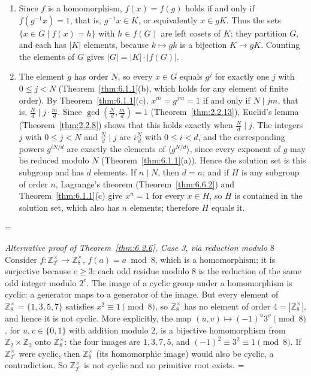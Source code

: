 \documentclass[11pt]{article}
\makeatletter
\theoremstyle{ntstyle}
\let\nt@closedisplay\]
\def\nt@guardedclose{\@ifnextchar\par{\nt@closeafterpar}{\@ifnextchar\end{\postdisplaypenalty\@M\nt@closedisplay}{\nt@closedisplay}}}
\def\nt@closeafterpar\par{\@ifnextchar\par{\nt@closeafterpar}{\@ifnextchar\end{\postdisplaypenalty\@M\nt@closedisplay\par}{\nt@closedisplay\par}}}
\renewenvironment{proof}[1][\proofname]{\par
  \pushQED{\qed}\normalfont\topsep\medskipamount\edef\nt@afterproof{\@endparpenalty=\the\@endparpenalty\relax}\@beginparpenalty\@M\@endparpenalty\@M\let\]\nt@guardedclose\trivlist\item[]\textit{#1\@addpunct{.}} \ignorespaces}{\ifvmode\addpenalty\@M\fi\popQED\nt@afterproof\endtrivlist\@endpefalse}
\newenvironment{altproof}[1][\proofname]{\begin{proof}[#1]}{\end{proof}}
\newcommand{\ZmodUnits}[1]{\mathbb{Z}_{#1}^{\times}}
\makeatother
\begin{document}
\begin{proof}

	\begin{enumerate}[label={\alph*)}]
		\item Since $f$ is a homomorphism, $f(x)=f(g)$ holds if and only if
					$f(g^{-1}x)=1$, that is, $g^{-1}x\in K$, or equivalently $x\in gK$.
					Thus the sets $\{x\in G\mid f(x)=h\}$ with $h\in f(G)$ are left
					cosets of $K$; they partition $G$, and each has $|K|$ elements,
					because $k\mapsto gk$ is a bijection $K\to gK$. Counting the elements
					of $G$ gives $|G|=|K|\cdot|f(G)|$.
		\item The element $g$ has order $N$, so every $x\in G$ equals $g^j$ for
					exactly one $j$ with $0\le j<N$ (Theorem~\ref{thm:6.1.1}(b), which holds
					for any element of finite order). By Theorem~\ref{thm:6.1.1}(c),
					$x^m=g^{jm}=1$ if and only if $N\mid jm$, that is,
					$\frac{N}{d}\mid j\cdot\frac{m}{d}$. Since $\gcd(\frac{N}{d},\frac{m}{d})=1$
					(Theorem~\ref{thm:2.2.13}), Euclid's lemma (Theorem~\ref{thm:2.2.8})
					shows that this holds exactly when $\frac{N}{d}\mid j$. The integers $j$
					with $0\le j<N$ and $\frac{N}{d}\mid j$ are $i\frac{N}{d}$ with
					$0\le i<d$, and the corresponding powers $g^{iN/d}$ are exactly the
					elements of $\langle g^{N/d}\rangle$, since every exponent of $g$ may be
					reduced modulo $N$ (Theorem~\ref{thm:6.1.1}(a)). Hence the solution set
					is this subgroup and has $d$ elements. If $n\mid N$, then $d=n$; and if
					$H$ is any subgroup of order $n$, Lagrange's theorem
					(Theorem~\ref{thm:6.6.2}) and Theorem~\ref{thm:6.1.1}(c) give $x^n=1$ for
					every $x\in H$, so $H$ is contained in the solution set, which also has
					$n$ elements; therefore $H$ equals it.\qedhere
	\end{enumerate}
\end{proof}
\begin{altproof}[Alternative proof of Theorem~\ref{thm:6.2.6}, Case 3, via reduction modulo $8$]
Consider $f : \ZmodUnits{2^e} \to
		\ZmodUnits{8}$, $f(a) = a \bmod 8$, which is a
	homomorphism; it is surjective because $e\ge3$: each odd residue
	modulo $8$ is the reduction of the same odd integer modulo $2^e$. The image of a cyclic group under a homomorphism is
	cyclic: a generator maps to a generator of the image. But every element of $\ZmodUnits{8} = \{1, 3, 5, 7\}$
	satisfies $x^{2} \equiv 1 \pmod{8}$, so $\ZmodUnits{8}$ has no
	element of order $4=|\ZmodUnits{8}|$, and hence it is not cyclic.
	More explicitly, the map $(u,v)\mapsto(-1)^u3^v\pmod{8}$, for
	$u,v\in\{0,1\}$ with addition modulo $2$, is a bijective homomorphism
	from $\mathbb{Z}_2\times\mathbb{Z}_2$ onto $\ZmodUnits{8}$:
	the four images are $1,3,7,5$, and $(-1)^2\equiv3^2\equiv1\pmod{8}$.
	If $\ZmodUnits{2^e}$ were cyclic, then
	$\ZmodUnits{8}$ (its homomorphic image) would also be cyclic,
	a contradiction. So $\ZmodUnits{2^e}$ is not cyclic and no
	primitive root exists.
\end{altproof}
\end{document}

